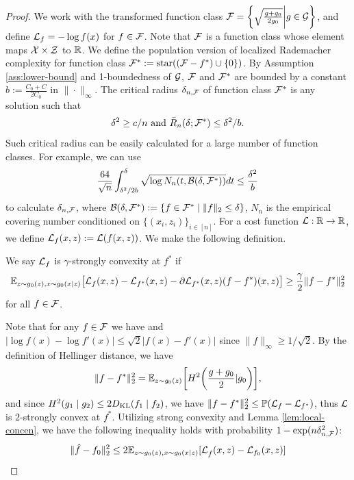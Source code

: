 \begin{proof}
 We work with the transformed function class $\mathcal{F} = \bigg\{ \sqrt{\frac{g+ g_0}{2g_0}}\biggl\vert g\in \mathcal{G} \bigg\}$, and define $\mathcal{L}_f = -\log f(x)$ for $f\in \mathcal{F}$. Note that $\mathcal{F}$ is a function class whose element maps $\mathcal{X}\times \mathcal{Z}$ to $\mathbb{R}$. We define the population version of localized Rademacher complexity for function class $\mathcal{F}^* := \operatorname{star}((\mathcal{F} - f^*) \cup \{0\})$. By Assumption \ref{ass:lower-bound} and 1-boundedness of $\mathcal{G}$,  $\mathcal{F}$ and $\mathcal{F}^*$ are bounded by a constant $b:= \frac{C_0+C}{2C_0}$ in $\|\cdot\|_\infty$.
 The critical radius $\delta_{n,\mathcal{F}}$ of function class $\mathcal{F}^*$ is any solution such that \begin{align*}
    \delta^2 \geq c/n \text{ and }\bar{R}_n (\delta; \mathcal{F}^*)\leq \delta^2/b.
\end{align*}
Such critical radius can be easily calculated for a large number of function classes. For example, we can use $$
\frac{64}{\sqrt{n}}\int_{\delta^2/2b}^{\delta}\sqrt{\log N_n(t, \mathcal{B}(\delta,\mathcal{F}^*))}dt \leq \frac{\delta^2}{b}
$$
to calculate $\delta_{n,\mathcal{F}}$, where $\mathcal{B}(\delta,\mathcal{F}^*) := \{f\in\mathcal{F}^*\mid \|f\|_2\leq \delta\}$, $N_n$ is the empirical covering number conditioned on $\{(x_i,z_i)\}_{i\in[n]}$.
For a cost function $\mathcal{L} : \mathbb{R} \rightarrow \mathbb{R}$, we define $\mathcal{L}_f(x,z):= \mathcal{L}(f(x,z))$.
We make the following definition. \begin{definition}\label{def:strong-convexity}
        We say $\mathcal{L}_f$ is $\gamma$-strongly convexity at $f^*$ if $$
\mathbb{E}_{z\sim g_0(z), x\sim g_0(x\mid z)}\big[\mathcal{L}_f(x,z) - \mathcal{L}_{f^*}(x,z) - \partial\mathcal{L}_{f^*}(x,z) (f - f^*)(x,z) \big] \geq \frac{\gamma}{2} \|f - f^*\|^2_2
$$ for all $f\in\mathcal{F}$.
\end{definition} 
Note that for any $f\in\mathcal{F}$ we have 
and $|\log f (x) - \log f'(x)|\leq \sqrt{2}|f(x) - f'(x)|$ since $\|f\|_\infty \geq 1/\sqrt{2}$. By the definition of Hellinger distance, we have  $$
\| f - f^*\|_2^2 = \mathbb{E}_{z\sim g_0(z)}\bigg[H^2\bigg(\frac{g+ g_0}{2}| g_0\bigg)\bigg],
$$
and since $H^2(g_1\mid g_2) \leq 2 D_{\text{KL}}(f_1\mid f_2)$, we have $\|f- f^*\|_2^2 \leq \mathbb{P}(\mathcal{L}_f - \mathcal{L}_{f^*})$, thus $\mathcal{L}$ is $2$-strongly convex at $f^*$.
Utilizing strong convexity and Lemma \ref{lem:local-concen}, we have the following inequality holds with probability $1- \exp(n\delta_{n,\mathcal{F}}^2)$: \begin{align*}
    \|\hat{f} - f_0\|_2^2 &\leq 2\E_{z\sim g_0(z), x\sim g_0(x|z)}[\Lcal_{\hat{f}}(x,z) - \Lcal_{f_0}(x,z)]\\

\end{align*}
\end{proof}
